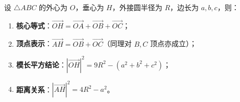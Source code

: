 \begin{statementbox}
设 $\triangle ABC$ 的外心为 $O$，垂心为 $H$，外接圆半径为 $R$，边长为 $a, b, c$，则：
\begin{enumerate}
    \item \textbf{核心等式}：$\vec{OH} = \vec{OA} + \vec{OB} + \vec{OC}$；
    \item \textbf{顶点表示}：$\vec{AH} = \vec{OB} + \vec{OC}$（同理对 $B, C$ 顶点亦成立）；
    \item \textbf{模长平方结论}：$|\vec{OH}|^2 = 9R^2 - (a^2 + b^2 + c^2)$；
    \item \textbf{距离关系}：$|\vec{AH}|^2 = 4R^2 - a^2$。
\end{enumerate}
\end{statementbox}